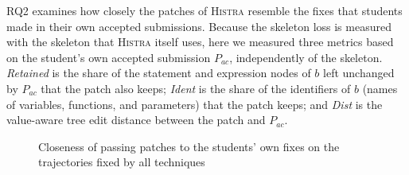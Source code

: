 \documentclass[10pt,conference]{IEEEtran}
\begin{document}
RQ2 examines how closely the patches of \textsc{Histra} resemble the fixes that students made in their own accepted submissions. Because the skeleton loss is measured with the skeleton that \textsc{Histra} itself uses, here we measured three metrics based on the student's own accepted submission $P_{\mathit{ac}}$, independently of the skeleton. \emph{Retained} is the share of the statement and expression nodes of $b$ left unchanged by $P_{\mathit{ac}}$ that the patch also keeps; \emph{Ident} is the share of the identifiers of $b$ (names of variables, functions, and parameters) that the patch keeps; and \emph{Dist} is the value-aware tree edit distance between the patch and $P_{\mathit{ac}}$.

\begin{figure}[h]
\centering
{}
\caption{Closeness of passing patches to the students' own fixes on the trajectories fixed by all techniques}
\label{fig:rq-close}
\end{figure}
\end{document}
